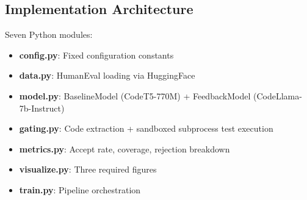 \subsection{Implementation Architecture}

Seven Python modules:
\begin{itemize}
    \item \textbf{config.py}: Fixed configuration constants
    \item \textbf{data.py}: HumanEval loading via HuggingFace
    \item \textbf{model.py}: BaselineModel (CodeT5-770M) + FeedbackModel (CodeLlama-7b-Instruct)
    \item \textbf{gating.py}: Code extraction + sandboxed subprocess test execution
    \item \textbf{metrics.py}: Accept rate, coverage, rejection breakdown
    \item \textbf{visualize.py}: Three required figures
    \item \textbf{train.py}: Pipeline orchestration
\end{itemize}
